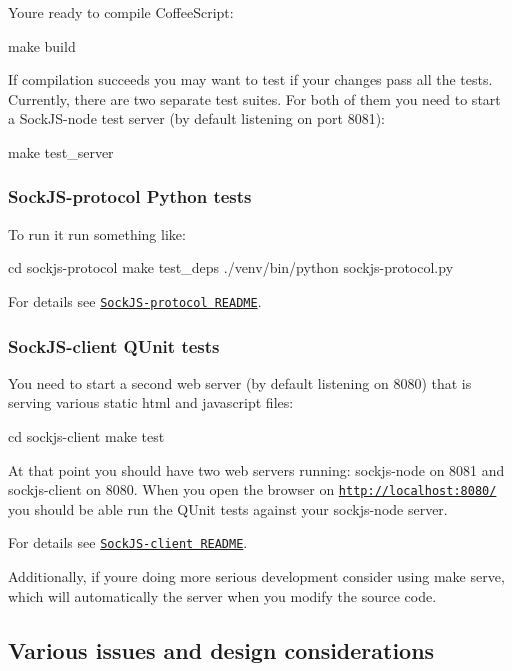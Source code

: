 You\textquotesingle{}re ready to compile Coffee\+Script\+: \begin{DoxyVerb}make build
\end{DoxyVerb}


If compilation succeeds you may want to test if your changes pass all the tests. Currently, there are two separate test suites. For both of them you need to start a Sock\+J\+S-\/node test server (by default listening on port 8081)\+: \begin{DoxyVerb}make test_server
\end{DoxyVerb}


\subsubsection*{Sock\+J\+S-\/protocol Python tests}

To run it run something like\+: \begin{DoxyVerb}cd sockjs-protocol
make test_deps
./venv/bin/python sockjs-protocol.py
\end{DoxyVerb}


For details see \href{https://github.com/sockjs/sockjs-protocol#readme}{\tt Sock\+J\+S-\/protocol R\+E\+A\+D\+ME}.

\subsubsection*{Sock\+J\+S-\/client Q\+Unit tests}

You need to start a second web server (by default listening on 8080) that is serving various static html and javascript files\+: \begin{DoxyVerb}cd sockjs-client
make test
\end{DoxyVerb}


At that point you should have two web servers running\+: sockjs-\/node on 8081 and sockjs-\/client on 8080. When you open the browser on \href{http://localhost:8080/}{\tt http\+://localhost\+:8080/} you should be able run the Q\+Unit tests against your sockjs-\/node server.

For details see \href{https://github.com/sockjs/sockjs-client#readme}{\tt Sock\+J\+S-\/client R\+E\+A\+D\+ME}.

Additionally, if you\textquotesingle{}re doing more serious development consider using {\ttfamily make serve}, which will automatically the server when you modify the source code.

\subsection*{Various issues and design considerations }

